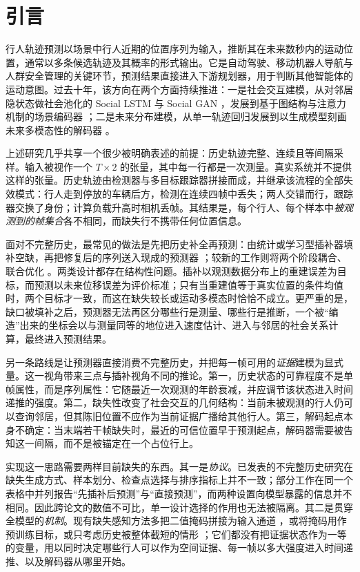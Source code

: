 \section{引言}
\label{sec:intro}

行人轨迹预测以场景中行人近期的位置序列为输入，推断其在未来数秒内的运动位置，通常以多条候选轨迹及其概率的形式输出。它是自动驾驶、移动机器人导航与人群安全管理的关键环节，预测结果直接进入下游规划器，用于判断其他智能体的运动意图。过去十年，该方向在两个方面持续推进：一是社会交互建模，从对邻居隐状态做社会池化的 Social LSTM 与 Social GAN \cite{alahi2016social,gupta2018social}，发展到基于图结构与注意力机制的场景编码器 \cite{mohamed2020social,yuan2021agentformer,liang2020lane,gao2020vectornet}；二是未来分布建模，从单一轨迹回归发展到以生成模型刻画未来多模态性的解码器 \cite{mangalam2020not,salzmann2020trajectron,fu2025moflow,zhang2024demo}。

上述研究几乎共享一个很少被明确表述的前提：历史轨迹完整、连续且等间隔采样。输入被视作一个 $T\times 2$ 的张量，其中每一行都是一次测量。真实系统并不提供这样的张量。历史轨迹由检测器与多目标跟踪器拼接而成，并继承该流程的全部失效模式：行人走到停放的车辆后方，检测在连续四帧中丢失；两人交错而行，跟踪器交换了身份；计算负载升高时相机丢帧。其结果是，每个行人、每个样本中\emph{被观测到的帧集合}各不相同，而缺失行不携带任何位置信息。

面对不完整历史，最常见的做法是先把历史补全再预测：由统计或学习型插补器填补空缺，再把修复后的序列送入现成的预测器 \cite{chib2024pedestrian,xu2023uncovering}；较新的工作则将两个阶段耦合、联合优化 \cite{chib2024mstip,chib2026hypergraph,sun2025rmpyolo}。两类设计都存在结构性问题。插补以观测数据分布上的重建误差为目标，而预测以未来位移误差为评价标准；只有当重建值等于真实位置的条件均值时，两个目标才一致，而这在缺失较长或运动多模态时恰恰不成立。更严重的是，缺口被填补之后，预测器无法再区分哪些行是测量、哪些行是推断，一个被“编造”出来的坐标会以与测量同等的地位进入速度估计、进入与邻居的社会关系计算，最终进入预测结果。

另一条路线是让预测器直接消费不完整历史，并把每一帧可用的\emph{证据}建模为显式量。这一视角带来三点与插补视角不同的推论。第一，历史状态的可靠程度不是单帧属性，而是序列属性：它随最近一次观测的年龄衰减，并应调节该状态进入时间递推的强度。第二，缺失性改变了社会交互的几何结构：当前未被观测的行人仍可以查询邻居，但其陈旧位置不应作为当前证据广播给其他行人。第三，解码起点本身不确定：当末端若干帧缺失时，最近的可信位置早于预测起点，解码器需要被告知这一间隔，而不是被锚定在一个占位行上。

实现这一思路需要两样目前缺失的东西。其一是\emph{协议}。已发表的不完整历史研究在缺失生成方式、样本划分、检查点选择与排序指标上并不一致；部分工作在同一个表格中并列报告“先插补后预测”与“直接预测”，而两种设置向模型暴露的信息并不相同。因此跨论文的数值不可比，单一设计选择的作用也无法被隔离。其二是贯穿全模型的\emph{机制}。现有缺失感知方法多把二值掩码拼接为输入通道 \cite{chen2023trajmae,yang2023rmp,chib2023dropping}，或将掩码用作预训练目标，或只考虑历史被整体截短的情形 \cite{sun2022momentary,monti2022howmany,qiu2025adapting}；它们都没有把证据状态作为一等的变量，用以同时决定哪些行人可以作为空间证据、每一帧以多大强度进入时间递推、以及解码器从哪里开始。

